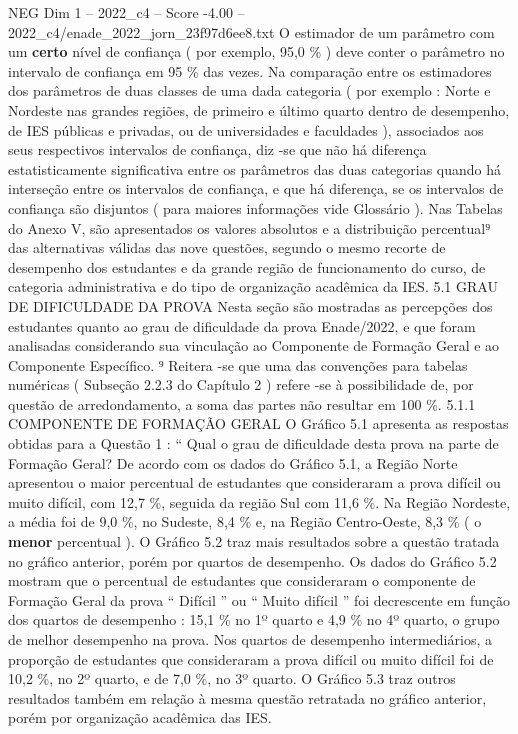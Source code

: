 \begin{textsample}{NEG Dim 1 – 2022\_c4 – Score -4.00 – 2022\_c4/enade\_2022\_jorn\_23f97d6ee8.txt}
O estimador de um parâmetro com um \textbf{certo} nível de confiança ( por exemplo, 95,0 \% ) deve conter o parâmetro no intervalo de confiança em 95 \% das vezes.
Na comparação entre os estimadores dos parâmetros de duas classes de uma dada categoria ( por exemplo : Norte e Nordeste nas grandes regiões, de primeiro e último quarto dentro de desempenho, de IES públicas e privadas, ou de universidades e faculdades ), associados aos seus respectivos intervalos de confiança, diz -se que não há diferença estatisticamente significativa entre os parâmetros das duas categorias quando há interseção entre os intervalos de confiança, e que há diferença, se os intervalos de confiança são disjuntos ( para maiores informações vide Glossário ).
Nas Tabelas do Anexo V, são apresentados os valores absolutos e a distribuição percentual⁹ das alternativas válidas das nove questões, segundo o mesmo recorte de desempenho dos estudantes e da grande região de funcionamento do curso, de categoria administrativa e do tipo de organização acadêmica da IES. 5.1 GRAU DE DIFICULDADE DA PROVA Nesta seção são mostradas as percepções dos estudantes quanto ao grau de dificuldade da prova Enade/2022, e que foram analisadas considerando sua vinculação ao Componente de Formação Geral e ao Componente Específico. ⁹ Reitera -se que uma das convenções para tabelas numéricas ( Subseção 2.2.3 do Capítulo 2 ) refere -se à possibilidade de, por questão de arredondamento, a soma das partes não resultar em 100 \%. 5.1.1 COMPONENTE DE FORMAÇÃO GERAL O Gráfico 5.1 apresenta as respostas obtidas para a Questão 1 : “ Qual o grau de dificuldade desta prova na parte de Formação Geral?
De acordo com os dados do Gráfico 5.1, a Região Norte apresentou o maior percentual de estudantes que consideraram a prova difícil ou muito difícil, com 12,7 \%, seguida da região Sul com 11,6 \%.
Na Região Nordeste, a média foi de 9,0 \%, no Sudeste, 8,4 \% e, na Região Centro-Oeste, 8,3 \% ( o \textbf{menor} percentual ).
O Gráfico 5.2 traz mais resultados sobre a questão tratada no gráfico anterior, porém por quartos de desempenho.
Os dados do Gráfico 5.2 mostram que o percentual de estudantes que consideraram o componente de Formação Geral da prova “ Difícil ” ou “ Muito difícil ” foi decrescente em função dos quartos de desempenho : 15,1 \% no 1º quarto e 4,9 \% no 4º quarto, o grupo de melhor desempenho na prova.
Nos quartos de desempenho intermediários, a proporção de estudantes que consideraram a prova difícil ou muito difícil foi de 10,2 \%, no 2º quarto, e de 7,0 \%, no 3º quarto.
O Gráfico 5.3 traz outros resultados também em relação à mesma questão retratada no gráfico anterior, porém por organização acadêmica das IES.

\end{textsample}
